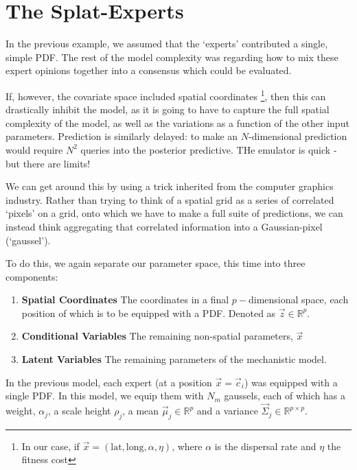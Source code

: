 \section{The Splat-Experts}

        In the previous example, we assumed that the `experts' contributed a single, simple PDF. The rest of the model complexity was regarding how to mix these expert opinions together into a consensus which could be evaluated. 

        If, however, the covariate space included spatial coordinates \footnote{In our case, if $\vec{x} = (\text{lat},\text{long}, \alpha,\eta)$, where $\alpha$ is the dispersal rate and $\eta$ the fitness cost}, then this can drastically inhibit the model, as it is going to have to capture the full spatial complexity of the model, as well as the variations as a function of the other input parameters. Prediction is similarly delayed: to make an $N$-dimensional prediction would require $N^2$ queries into the posterior predictive. THe emulator is quick - but there are limits!

        We can get around this by using a trick inherited from the computer graphics industry. Rather than trying to think of a spatial grid as a series of correlated `pixels' on a grid, onto which we have to make a full suite of predictions, we can instead think aggregating that correlated information into a Gaussian-pixel (`gaussel').

        To do this, we again separate our parameter space, this time into three components:
        \begin{enumerate}
            \item \textbf{Spatial Coordinates} The coordinates in a final $p-$dimensional space, each position of which is to be equipped with a PDF. Denoted as $\vec{z} \in \mathbb{R}^p$.
            \item \textbf{Conditional Variables} The remaining non-spatial parameters, $\vec{x}$
            \item \textbf{Latent Variables} The remaining parameters of the mechanistic model. 
        \end{enumerate}

        In the previous model, each expert (at a position $\vec{x} = \vec{c}_i$) was equipped with a single PDF. In this model, we equip them with $N_m$ gaussels, each of which has a weight, $\alpha_j$, a scale height $\rho_j$, a mean $\vec{\mu}_j \in \mathbb{R}^p$ and a variance $\vec{\Sigma}_j \in \mathbb{R}^{p\times p}$. 

